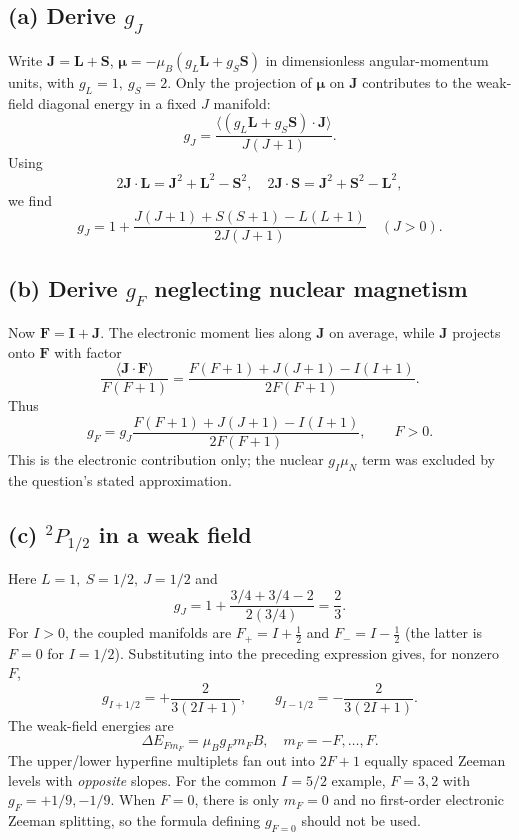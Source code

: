 \subsection*{(a) Derive \(g_J\)}
Write \(\mathbf J=\mathbf L+\mathbf S\),
\(\boldsymbol\mu=-\mu_B(g_L\mathbf L+g_S\mathbf S)\)
in dimensionless angular-momentum units,
with \(g_L=1,\ g_S=2\).
Only the projection of \(\boldsymbol\mu\)
on \(\mathbf J\) contributes to the
weak-field diagonal energy in a fixed \(J\) manifold:
\[
g_J=\frac{\langle(g_L\mathbf L+g_S\mathbf S)
\cdot\mathbf J\rangle}{J(J+1)}.
\]
Using
\[
2\mathbf J\cdot\mathbf L
=\mathbf J^2+\mathbf L^2-\mathbf S^2,\quad
2\mathbf J\cdot\mathbf S
=\mathbf J^2+\mathbf S^2-\mathbf L^2,
\]
we find
\[
\boxed{g_J=1+
\frac{J(J+1)+S(S+1)-L(L+1)}{2J(J+1)}}
\quad (J>0).
\]

\subsection*{(b) Derive \(g_F\) neglecting nuclear magnetism}
Now \(\mathbf F=\mathbf I+\mathbf J\).
The electronic moment lies along \(\mathbf J\)
on average, while \(\mathbf J\) projects onto
\(\mathbf F\) with factor
\[
\frac{\langle\mathbf J\cdot\mathbf F\rangle}{F(F+1)}
=\frac{F(F+1)+J(J+1)-I(I+1)}{2F(F+1)}.
\]
Thus
\[
\boxed{g_F=g_J
\frac{F(F+1)+J(J+1)-I(I+1)}{2F(F+1)}},
\qquad F>0.
\]
This is the electronic contribution only;
the nuclear \(g_I\mu_N\) term was excluded
by the question's stated approximation.

\subsection*{(c) \({}^2P_{1/2}\) in a weak field}
Here \(L=1,\ S=1/2,\ J=1/2\) and
\[
g_J=1+\frac{3/4+3/4-2}{2(3/4)}
=\boxed{\frac23}.
\]
For \(I>0\), the coupled manifolds are
\(F_+=I+\tfrac12\) and \(F_-=I-\tfrac12\)
(the latter is \(F=0\) for \(I=1/2\)).
Substituting into the preceding expression
gives, for nonzero \(F\),
\[
\boxed{g_{I+1/2}=+\frac{2}{3(2I+1)},\qquad
g_{I-1/2}=-\frac{2}{3(2I+1)}}.
\]
The weak-field energies are
\[
\boxed{\Delta E_{Fm_F}=\mu_B g_Fm_FB},
\quad m_F=-F,\ldots,F.
\]
The upper/lower hyperfine multiplets
fan out into \(2F+1\) equally spaced
Zeeman levels with \emph{opposite} slopes.
For the common \(I=5/2\) example,
\(F=3,2\) with \(g_F=+1/9,-1/9\).
When \(F=0\), there is only \(m_F=0\)
and no first-order electronic Zeeman
splitting, so the formula defining \(g_{F=0}\)
should not be used.
